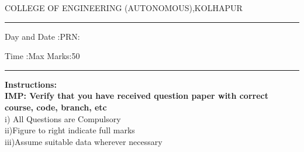 \documentclass[12pt]{article}
\begin{document}
	\par
	{COLLEGE OF ENGINEERING (AUTONOMOUS),KOLHAPUR}
	\par\noindent\rule{\textwidth}{0.4pt}
	
	\par
	\par
	\par
	\begin{flushleft}
		Day and Date :{}\hspace{5.5cm}PRN:
	\end{flushleft}
	
	\begin{flushleft}
		Time :{}\hspace{7cm}Max Marks:{50}\\
	\end{flushleft}
	\noindent\rule{\textwidth}{0.1pt}
\begin{flushleft}
	{\bf Instructions:}\\
	{\hspace{0.5cm} \bf IMP: Verify that you have received question paper with correct course, code, branch, etc}\\
	\hspace{1cm}i) All Questions are Compulsory\\
	\hspace{1cm}ii)Figure to right indicate full marks\\
	\hspace{1cm}iii)Assume suitable data wherever necessary\\
\end{flushleft}
\end{document}
